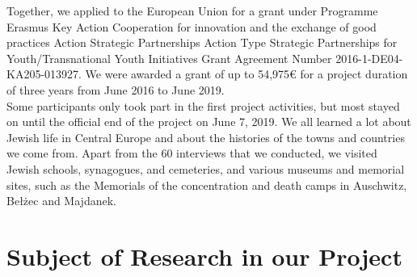 Together, we applied to the European Union for a grant under Programme Erasmus\+ Key Action Cooperation for innovation and the exchange of good practices Action Strategic Partnerships Action Type Strategic Partnerships for Youth/Transnational Youth Initiatives Grant Agreement Number 2016-1-DE04-KA205-013927. We were awarded a grant of up to 54,975\euro{} for a project duration of three years from June 2016 to June 2019. \\
Some participants only took part in the first project activities, but most stayed on until the official end of the project on June 7, 2019. We all learned a lot about Jewish life in Central Europe and about the histories of the towns and countries we come from. Apart from the 60 interviews that we conducted, we visited Jewish schools, synagogues, and cemeteries, and various museums and memorial sites, such as the Memorials of the concentration and death camps in Auschwitz, Bełżec and Majdanek. 

\section*{Subject of Research in our Project}

